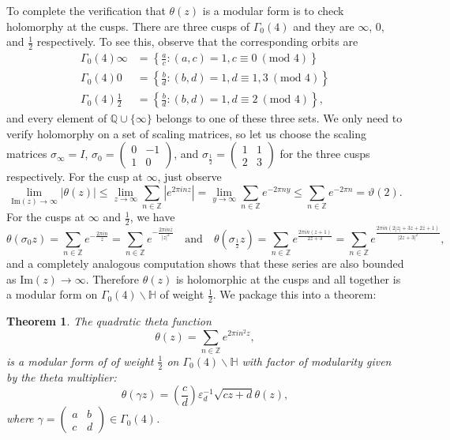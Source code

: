 \documentclass[12pt]{book}
\newtheorem{theorem}{Theorem}[section]
\theoremstyle{definition}\newframedtheorem{method}{Method}
\newcommand{\legendre}[2]{\genfrac{(}{)}{0.5pt}{0}{#1}{#2}}
\newcommand{\tmod}[1]{\ \left(\text{mod }#1\right)}
\newcommand{\Z}{\mathbb{Z}}
\newcommand{\Q}{\mathbb{Q}}
\renewcommand{\H}{\mathbb{H}}
\newcommand{\g}{\gamma}
\renewcommand{\t}{\theta}
\newcommand{\s}{\sigma}
\newcommand{\G}{\Gamma}
\newcommand{\e}{\varepsilon}
\newcommand{\vt}{\vartheta}
\newcommand{\<}{\langle}
\renewcommand{\>}{\rangle}
\newcommand{\conj}{\overline}
\renewcommand{\Im}{\mathrm{Im}}
\begin{document}
    To complete the verification that $\t(z)$ is a modular form is to check holomorphy at the cusps. There are three cusps of $\G_{0}(4)$ and they are $\infty$, $0$, and $\frac{1}{2}$ respectively. To see this, observe that the corresponding orbits are
    \begin{align*}
      \G_{0}(4)\infty &= \left\{\frac{a}{c}:(a,c) = 1, c \equiv 0 \tmod{4} \right\} \\
      \G_{0}(4)0 &= \left\{\frac{b}{d}:(b,d) = 1, d \equiv 1,3 \tmod{4} \right\} \\
      \G_{0}(4)\frac{1}{2} &= \left\{\frac{b}{d}:(b,d) = 1, d \equiv 2 \tmod{4} \right\},
    \end{align*}
    and every element of $\Q \cup \{\infty\}$ belongs to one of these three sets. We only need to verify holomorphy on a set of scaling matrices, so let us choose the scaling matrices $\s_{\infty} = I$, $\s_{0} = \begin{pmatrix} 0 & -1 \\ 1 & 0 \end{pmatrix}$, and $\s_{\frac{1}{2}} = \begin{pmatrix} 1 & 1 \\ 2 & 3 \end{pmatrix}$ for the three cusps respectively. For the cusp at $\infty$, just observe
    \[
      \lim_{\Im(z) \to \infty}|\t(z)| \le \lim_{z \to \infty}\sum_{n \in \Z}|e^{2\pi inz}| = \lim_{y \to \infty}\sum_{n \in \Z}e^{-2\pi ny} \le \sum_{n \in \Z}e^{-2\pi n} = \vt(2).
    \]
    For the cusps at $\infty$ and $\frac{1}{2}$, we have
    \[
      \t(\s_{0} z) = \sum_{n \in \Z}e^{-\frac{2\pi in}{z}} = \sum_{n \in \Z}e^{-\frac{2\pi in\conj{z}}{|z|^{2}}} \quad \text{and} \quad \t(\s_{\frac{1}{2}} z) = \sum_{n \in \Z}e^{\frac{2\pi in(z+1)}{2z+3}} = \sum_{n \in \Z}e^{\frac{2\pi in(2|z|+3z+2\conj{z}+1)}{|2z+3|^{2}}},
    \]
    and a completely analogous computation shows that these series are also bounded as $\Im(z) \to \infty$. Therefore $\t(z)$ is holomorphic at the cusps and all together is a modular form on $\G_{0}(4)\backslash\H$ of weight $\frac{1}{2}$. We package this into a theorem:

    \begin{theorem}
      The quadratic theta function
      \[
          \t(z) = \sum_{n \in \Z}e^{2\pi in^{2}z},
      \]
      is a modular form of of weight $\frac{1}{2}$ on $\G_{0}(4)\backslash\H$ with factor of modularity given by the theta multiplier:
      \[
        \t(\g z) = \legendre{c}{d}\e_{d}^{-1}\sqrt{cz+d}\t(z),
      \]
      where $\g = \begin{pmatrix} a & b \\ c & d \end{pmatrix} \in \G_{0}(4)$.
    \end{theorem}
\end{document}
